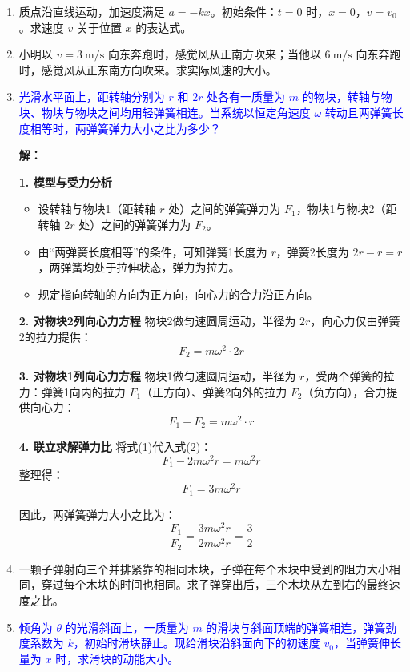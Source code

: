 \documentclass[11pt,a4paper]{article}
\begin{document}
\begin{enumerate}
    \item 质点沿直线运动，加速度满足 \( a = -kx \)。初始条件：\( t=0 \) 时，\( x=0 \)，\( v=v_0 \)。求速度 \( v \) 关于位置 \( x \) 的表达式。

    \item 小明以 \( v=3\ \mathrm{m/s} \) 向东奔跑时，感觉风从正南方吹来；当他以 \( 6\ \mathrm{m/s} \) 向东奔跑时，感觉风从正东南方向吹来。求实际风速的大小。

    \item \textcolor{blue}{光滑水平面上，距转轴分别为 \( r \) 和 \( 2r \) 处各有一质量为 \( m \) 的物块，转轴与物块、物块与物块之间均用轻弹簧相连。当系统以恒定角速度 \( \omega \) 转动且两弹簧长度相等时，两弹簧弹力大小之比为多少？}
\vspace{0.5em}

\textbf{解：}

\noindent \textbf{1. 模型与受力分析}
\begin{itemize}
    \item 设转轴与物块1（距转轴 \( r \) 处）之间的弹簧弹力为 \( F_1 \)，物块1与物块2（距转轴 \( 2r \) 处）之间的弹簧弹力为 \( F_2 \)。
    \item 由“两弹簧长度相等”的条件，可知弹簧1长度为 \( r \)，弹簧2长度为 \( 2r - r = r \)，两弹簧均处于拉伸状态，弹力为拉力。
    \item 规定指向转轴的方向为正方向，向心力的合力沿正方向。
\end{itemize}

\noindent \textbf{2. 对物块2列向心力方程}
物块2做匀速圆周运动，半径为 \( 2r \)，向心力仅由弹簧2的拉力提供：
\[
F_2 = m \omega^2 \cdot 2r
\tag{1}
\]

\noindent \textbf{3. 对物块1列向心力方程}
物块1做匀速圆周运动，半径为 \( r \)，受两个弹簧的拉力：弹簧1向内的拉力 \( F_1 \)（正方向）、弹簧2向外的拉力 \( F_2 \)（负方向），合力提供向心力：
\[
F_1 - F_2 = m \omega^2 \cdot r
\tag{2}
\]

\noindent \textbf{4. 联立求解弹力比}
将式(1)代入式(2)：
\[
F_1 - 2m\omega^2 r = m\omega^2 r
\]
整理得：
\[
F_1 = 3m\omega^2 r
\]

因此，两弹簧弹力大小之比为：
\[
\frac{F_1}{F_2} = \frac{3m\omega^2 r}{2m\omega^2 r} = \frac{3}{2}
\]
    \item 一颗子弹射向三个并排紧靠的相同木块，子弹在每个木块中受到的阻力大小相同，穿过每个木块的时间也相同。求子弹穿出后，三个木块从左到右的最终速度之比。

    \item \textcolor{blue}{倾角为 \( \theta \) 的光滑斜面上，一质量为 \( m \) 的滑块与斜面顶端的弹簧相连，弹簧劲度系数为 \( k \)，初始时滑块静止。现给滑块沿斜面向下的初速度 \( v_0 \)，当弹簧伸长量为 \( x \) 时，求滑块的动能大小。}


\end{enumerate}
\end{document}
